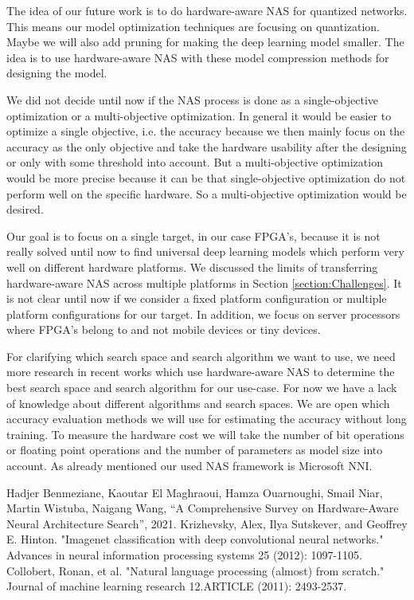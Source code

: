 \documentclass[conference]{IEEEtran}
\begin{document}
The idea of our future work is to do hardware-aware NAS for quantized networks. This means our model optimization techniques are focusing on quantization. Maybe we will also add pruning for making the deep learning model smaller. The idea is to use hardware-aware NAS with these model compression methods for designing the model. 

We did not decide until now if the NAS process is done as a single-objective optimization or a multi-objective optimization. In general it would be easier to optimize a single objective, i.e. the accuracy because we then mainly focus on the accuracy as the only objective and take the hardware usability after the designing or only with some threshold into account. But a multi-objective optimization would be more precise because it can be that single-objective optimization do not perform well on the specific hardware. So a multi-objective optimization would be desired.

Our goal is to focus on a single target, in our case FPGA's, because it is not really solved until now to find universal deep learning models which perform very well on different hardware platforms. We discussed the limits of transferring hardware-aware NAS across multiple platforms in Section \ref{section:Challenges}. It is not clear until now if we consider a fixed platform configuration or multiple platform configurations for our target. In addition, we focus on server processors where FPGA's belong to and not mobile devices or tiny devices. 

For clarifying which search space and search algorithm we want to use, we need more research in recent works which use hardware-aware NAS to determine the best search space and search algorithm for our use-case. For now we have a lack of knowledge about different algorithms and search spaces. We are open which accuracy evaluation methods we will use for estimating the accuracy without long training. To measure the hardware cost we will take the number of bit operations or floating point operations and the number of parameters as model size into account. As already mentioned our used NAS framework is Microsoft NNI. 

\begin{thebibliography}{00}
 Hadjer Benmeziane, Kaoutar El Maghraoui, Hamza Ouarnoughi, Smail Niar, Martin Wistuba, Naigang Wang, ``A Comprehensive Survey on Hardware-Aware Neural Architecture Search'', 2021.
 Krizhevsky, Alex, Ilya Sutskever, and Geoffrey E. Hinton. "Imagenet classification with deep convolutional neural networks." Advances in neural information processing systems 25 (2012): 1097-1105.
 Collobert, Ronan, et al. "Natural language processing (almost) from scratch." Journal of machine learning research 12.ARTICLE (2011): 2493-2537.
\end{thebibliography}
\end{document}
